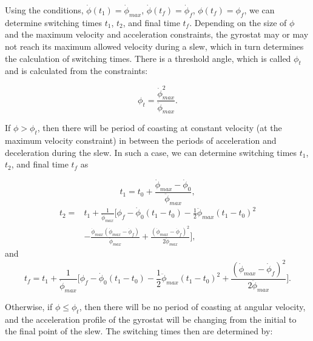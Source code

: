 \documentclass[journal ]{new-aiaa}
\begin{document}

Using the conditions, $\dot{\phi}(t_1)=\dot{\phi}_{max}$, $\dot{\phi}(t_f)=\dot{\phi}_f$, $\phi(t_f)=\phi_f$, we can determine switching times $t_1$, $t_2$, and final time $t_f$. Depending on the size of $\phi$ and the maximum velocity and acceleration constraints, the gyrostat may or may not reach its maximum allowed velocity during a slew, which in turn determines the calculation of switching times. There is a threshold angle, which is called $\phi_t$ and is calculated from the constraints: 

\begin{equation}\label{phi_t}
\phi_t = \frac{\dot{\phi}_{max}^2}{\ddot{\phi}_{max}}. 
\end{equation}

If $\phi > \phi_t$, then there will be period of coasting at constant velocity (at the maximum velocity constraint) in between the periods of acceleration and deceleration during the slew. In such a case, we can determine switching times $t_1$, $t_2$, and final time $t_f$ as

\begin{equation}\label{t1cons}
t_1=t_0+\frac{\dot{\phi}_{max}-\dot{\phi}_0}{\ddot{\phi}_{max}},
\end{equation}
\begin{equation}\label{t2cons}
\begin{split}
t_2=&t_1+\frac{1}{\dot{\phi}_{max}}\Big[ \phi_f-\dot{\phi}_0(t_1-t_0)-\frac{1}{2}\ddot{\phi}_{max}(t_1-t_0)^2\\
&-\frac{\dot{\phi}_{max}(\dot{\phi}_{max}-\dot{\phi}_f)}{\ddot{\phi}_{max}}+\frac{(\dot{\phi}_{max}-\dot{\phi}_f)^2}{2\ddot{\phi}_{max}} \Big],
\end{split}
\end{equation}
and
\begin{equation}\label{tfcons}
t_f=t_1+\frac{1}{\dot{\phi}_{max}}\Big[ \phi_f-\dot{\phi}_0(t_1-t_0)-\frac{1}{2}\ddot{\phi}_{max}(t_1-t_0)^2+\frac{(\dot{\phi}_{max}-\dot{\phi}_f)^2}{2\ddot{\phi}_{max}} \Big].
\end{equation}

Otherwise, if $\phi \leq \phi_t$, then there will be no period of coasting at angular velocity, and the acceleration profile of the gyrostat will be changing from the initial to the final point of the slew. The switching times then are determined by: 
\end{document}
